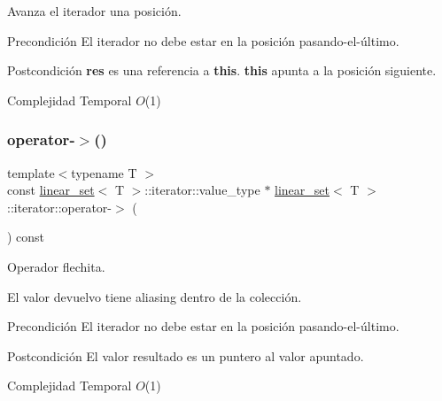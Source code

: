 Avanza el iterador una posición. 

\begin{DoxyPrecond}{Precondición}
El iterador no debe estar en la posición pasando-\/el-\/último. 
\end{DoxyPrecond}
\begin{DoxyPostcond}{Postcondición}
{\bfseries res} es una referencia a {\bfseries this}. {\bfseries this} apunta a la posición siguiente.
\end{DoxyPostcond}

\begin{DoxyDescription}
\item[Complejidad Temporal]$O$(1)
\end{DoxyDescription}\mbox{\label{classlinear__set_1_1iterator_a1fecf49af137b411d290f4a49be344c9}} 
\subsubsection{\texorpdfstring{operator-\/$>$()}{operator->()}}
{\footnotesize\ttfamily template$<$typename T $>$ \\
const \mbox{\hyperlink{classlinear__set}{linear\+\_\+set}}$<$ T $>$\+::iterator\+::value\+\_\+type $\ast$ \mbox{\hyperlink{classlinear__set}{linear\+\_\+set}}$<$ T $>$\+::iterator\+::operator-\/$>$ (\begin{DoxyParamCaption}{ }\end{DoxyParamCaption}) const}



Operador flechita. 

El valor devuelvo tiene aliasing dentro de la colección.

\begin{DoxyPrecond}{Precondición}
El iterador no debe estar en la posición pasando-\/el-\/último. 
\end{DoxyPrecond}
\begin{DoxyPostcond}{Postcondición}
El valor resultado es un puntero al valor apuntado.
\end{DoxyPostcond}

\begin{DoxyDescription}
\item[Complejidad Temporal]$O$(1)
\end{DoxyDescription}\mbox{\label{classlinear__set_1_1iterator_a8ed9cc85835c8159a2cd2c0208b000f0}} 
